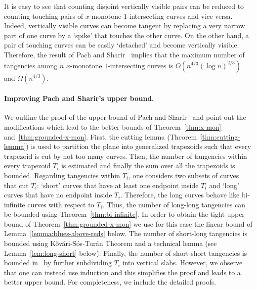\documentclass[11pt]{article}
\theoremstyle{definition}
\begin{document}
It is easy to see that counting disjoint vertically visible pairs can be reduced to counting touching pairs of $x$-monotone $1$-intersecting curves and vice versa.
Indeed, vertically visible curves can become tangent by replacing a very narrow part of one curve by a `spike' that touches the other curve. On the other hand, a pair of touching curves can be easily `detached' and become vertically visible.
Therefore, the result of Pach and Sharir~\cite{Pach-Sharir} implies that the maximum number of tangencies among $n$ $x$-monotone $1$-intersecting curves is $O\left(n^{4/3}\left(\log n\right)^{2/3}\right)$ and $\Omega\left(n^{4/3}\right)$.

\paragraph{Improving Pach and Sharir's upper bound.}
We outline the proof of the upper bound of Pach and Sharir~\cite{Pach-Sharir} and point out the modifications which lead to the better bounds of Theorem~\ref{thm:x-mon} and~\ref{thm:grounded-x-mon}.
First, the cutting lemma (Theorem~\ref{thm:cutting-lemma}) is used to partition the plane into generalized trapezoids such that every trapezoid is cut by not too many curves.
Then, the number of tangencies within every trapezoid $T_i$ is  estimated and finally the sum over all the trapezoids is bounded.
Regarding tangencies within $T_i$, one considers two subsets of curves that cut $T_i$: `short' curves that have at least one endpoint inside $T_i$ and `long' curves that have no endpoint inside $T_i$.
Therefore, the long curves behave like bi-infinite curves with respect to $T_i$.
Thus, the number of long-long tangencies can be bounded using Theorem~\ref{thm:bi-infinite}.
In order to obtain the tight upper bound of Theorem~\ref{thm:grounded-x-mon} we use for this case the linear bound of Lemma~\ref{lemma:blues-above-reds} below.
The number of short-long tangencies is bounded using K\H{o}v\'ari-S\'os-Tur\'an Theorem and a technical lemma (see Lemma~\ref{lem:long-short} below).
Finally, the number of short-short tangencies is bounded in~\cite{Pach-Sharir} by further subdividing $T_i$ into vertical slabs. However, we observe that one can instead use induction and this simplifies the proof and leads to a better upper bound.
For completeness, we include the detailed proofs.

\end{document}
